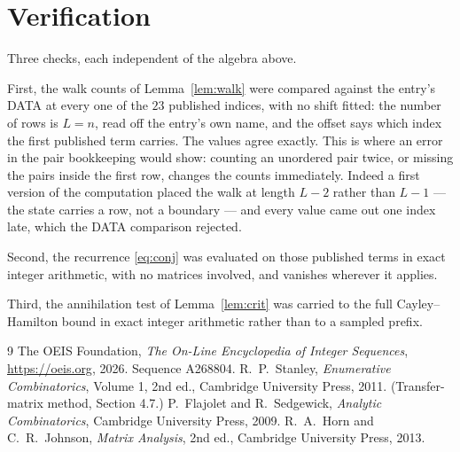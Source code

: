 \documentclass[11pt,a4paper]{article}
\theoremstyle{plain}
\theoremstyle{definition}
\begin{document}
\section{Verification}

Three checks, each independent of the algebra above.

First, the walk counts of Lemma~\ref{lem:walk} were compared against the entry's DATA at
every one of the $23$ published indices, with no shift fitted: the number of rows is
$L=n$, read off the entry's own name, and the offset says which index the first
published term carries. The values agree exactly. This is where an error in the pair
bookkeeping would show: counting an unordered pair twice, or missing the pairs inside the
first row, changes the counts immediately. Indeed a first version of the computation
placed the walk at length $L-2$ rather than $L-1$ --- the state carries a row, not a
boundary --- and every value came out one index late, which the DATA comparison rejected.

Second, the recurrence \eqref{eq:conj} was evaluated on those published terms in exact
integer arithmetic, with no matrices involved, and vanishes wherever it applies.

Third, the annihilation test of Lemma~\ref{lem:crit} was carried to the full
Cayley--Hamilton bound in exact integer arithmetic rather than to a sampled prefix.

\begin{thebibliography}{9}
 The OEIS Foundation, \emph{The On-Line Encyclopedia of Integer
Sequences}, \url{https://oeis.org}, 2026. Sequence A268804.
 R.~P.~Stanley, \emph{Enumerative Combinatorics}, Volume 1, 2nd ed.,
Cambridge University Press, 2011. (Transfer-matrix method, Section 4.7.)
 P.~Flajolet and R.~Sedgewick, \emph{Analytic Combinatorics}, Cambridge
University Press, 2009.
 R.~A.~Horn and C.~R.~Johnson, \emph{Matrix Analysis}, 2nd ed., Cambridge
University Press, 2013.
\end{thebibliography}
\end{document}
